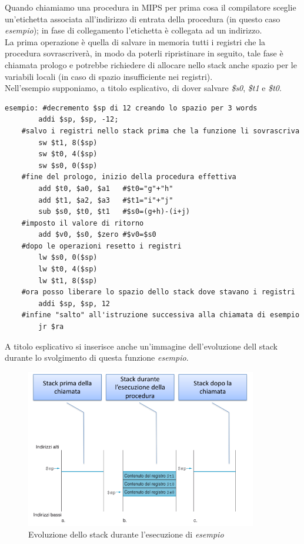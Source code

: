 \documentclass[class=book, crop=false]{standalone}
\begin{document}
Quando chiamiamo una procedura in MIPS per prima cosa il compilatore sceglie un’etichetta associata all’indirizzo di entrata della procedura (in questo caso \emph{esempio}); in fase di collegamento l'etichetta è collegata ad un indirizzo.\\
La prima operazione è quella di salvare in memoria tutti i registri che la procedura sovrascriverà, in modo da poterli ripristinare in seguito, tale fase è chiamata prologo e potrebbe richiedere di allocare nello stack anche spazio per le variabili locali (in caso di spazio insufficiente nei registri).\\
Nell'esempio supponiamo, a titolo esplicativo, di dover salvare \emph{\$s0}, \emph{\$t1} e \emph{\$t0}.\\

\begin{verbatim}
esempio: #decremento $sp di 12 creando lo spazio per 3 words
		addi $sp, $sp, -12;
	#salvo i registri nello stack prima che la funzione li sovrascriva
		sw $t1, 8($sp)
		sw $t0, 4($sp)
		sw $s0, 0($sp)
	#fine del prologo, inizio della procedura effettiva
		add $t0, $a0, $a1	#$t0="g"+"h"
		add $t1, $a2, $a3	#$t1="i"+"j"
		sub $s0, $t0, $t1	#$s0=(g+h)-(i+j)
	#imposto il valore di ritorno
		add $v0, $s0, $zero #$v0=$s0
	#dopo le operazioni resetto i registri
		lw $s0, 0($sp)
		lw $t0, 4($sp)
		lw $t1, 8($sp)
	#ora posso liberare lo spazio dello stack dove stavano i registri
		addi $sp, $sp, 12
	#infine "salto" all'istruzione successiva alla chiamata di esempio
		jr $ra
\end{verbatim}

A titolo esplicativo si inserisce anche un'immagine dell'evoluzione dell stack durante lo svolgimento di questa funzione \emph{esempio}.

\begin{figure}[H]
	\centering
	\caption{Evoluzione dello stack durante l'esecuzione di \emph{esempio}}
	\includegraphics[width=0.9\textwidth,keepaspectratio]{Evoluzione-stack}
\end{figure}
\end{document}
